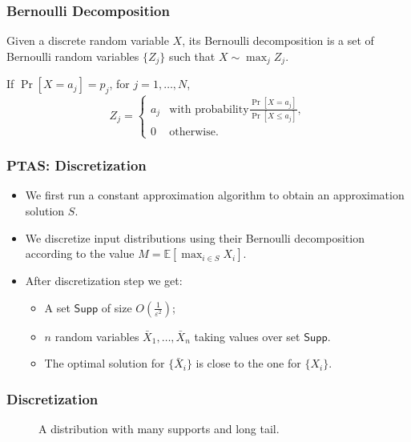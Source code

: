 \documentclass{beamer}
\newcommand{\Exp}{{\mathbb{E}}}
\begin{document}
\begin{frame}
    \frametitle{Bernoulli Decomposition}
    \begin{definition}
        Given a discrete random variable $X$, its Bernoulli decomposition is a set of Bernoulli random variables $\{Z_j\}$ such that $X\sim \max_j Z_j$.
    \end{definition}
    If $\Pr[X = a_j] = p_j$, for $j = 1, \ldots, N$, 
    $$Z_j = \left\{
        \begin{array}{ll}
            a_j & \text{with probability} \frac{\Pr[X = a_j]}{\Pr[X \leq a_j]},\\
            0 & \text{otherwise}.
        \end{array}
        \right.
        $$
\end{frame}

\begin{frame}
    \frametitle{PTAS: Discretization}
    \begin{itemize}
        \item    We first run a constant approximation algorithm to obtain an approximation solution $S$.\\
        \item    We discretize input distributions using their Bernoulli decomposition according to the value $M = \Exp[\max_{i\in S} X_i]$.\\
        \item    After discretization step we get:
    \begin{itemize}
        \item A set $\mathsf{Supp}$ of size $O(\frac{1}{\varepsilon^2})$;
        \item $n$ random variables $\bar X_1, \ldots, \bar X_n$ taking values over set $\mathsf{Supp}$.
        \item The optimal solution for $\{\bar X_i\}$ is close to the one for $\{X_i\}$.
    \end{itemize}
    \end{itemize}

\end{frame}
\begin{frame}
    \frametitle{Discretization}
    \begin{figure}
    \caption{A distribution with many supports and long tail.}
\end{figure}
\end{frame}
\end{document}
